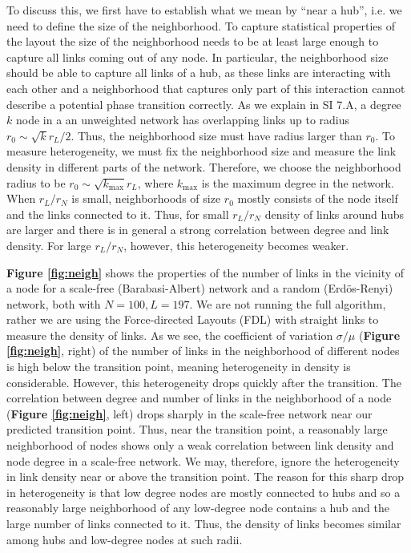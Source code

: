 \documentclass[endfloats,nofootinbib,preprint,floatfix,titlepage,superscriptaddress,linenumbers]{revtex4-1} %
\begin{document}
{%
To discuss this, we first have to establish what we mean by ``near a hub'', i.e. we need to define the size of the neighborhood.
To capture statistical properties of the layout the size of the neighborhood needs to be at least large enough to capture all links coming out of any node. 
In particular, the neighborhood size should be able to capture all links of a hub, as these links are interacting with each other and a neighborhood that captures only part of this interaction cannot describe a potential phase transition correctly. 
As we explain in SI 7.A, a degree $k$ node in a an unweighted network has overlapping links up to radius $r_0\sim \sqrt{k} r_L/2 $. 
Thus, the neighborhood size must have radius larger than $r_0$. 
To measure heterogeneity, we must fix the neighborhood size and measure the link density in different parts of the network. 
Therefore, we choose the neighborhood radius to be $r_0\sim \sqrt{k_{\max}} r_L  $, where $k_{\max}$ is the maximum degree in the network. 
When $r_L/r_N$ is small, neighborhoods of size $r_0$ mostly consists of the node itself and the links connected to it. 
Thus, for small $r_L/r_N$ density of links around hubs are larger and there is in general  a strong correlation between degree and link density. 
For large $r_L/r_N$, however, this heterogeneity becomes weaker. 

\textbf{Figure \ref{fig:neigh}} shows the properties of the number of links in the vicinity of a node for a scale-free (Barabasi-Albert) network and a random (Erd\"os-Renyi) network, both with $N=100, L=197$. 
We are not running the full algorithm, rather we are using the Force-directed Layouts (FDL) with straight links to measure the density of links. 
As we see, the coefficient of variation $\sigma/\mu$ (\textbf{Figure \ref{fig:neigh}}, right) of the number of links in the neighborhood of different nodes is high below the transition point, meaning heterogeneity in density is considerable. 
However, this heterogeneity  drops quickly after the transition.  
The correlation between degree and number of links in the neighborhood of a node (\textbf{Figure \ref{fig:neigh}}, left) drops sharply in the scale-free  network near our predicted transition point. 
Thus, near the transition point, a reasonably large neighborhood of nodes shows only a weak correlation between link density and node degree in a scale-free network.
We may, therefore, ignore the heterogeneity in link density near or above the transition point. 
The reason for this sharp drop in heterogeneity is that low degree nodes are mostly connected to hubs and so a reasonably large neighborhood of any low-degree node contains a hub and the large number of links connected to it. Thus, the density of links becomes similar among hubs and low-degree nodes at such radii.  

}
\end{document}
